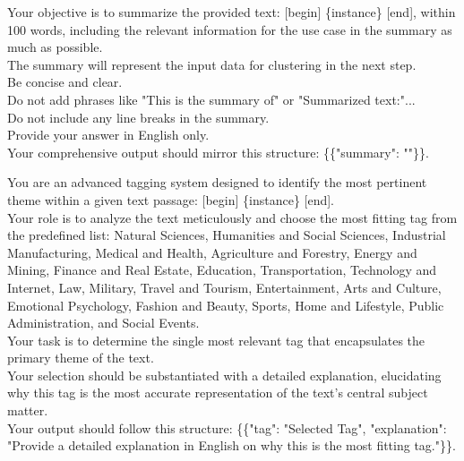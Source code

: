 \begin{tcolorbox}[title = {Prompt Template For Summary},breakable]
\label{summary}
\small
Your objective is to summarize the provided text: [begin] \{instance\} [end], within 100 words, including the relevant information for the use case in the summary as much as possible. \\
    The summary will represent the input data for clustering in the next step. \\
    Be concise and clear. \\
    Do not add phrases like "This is the summary of" or "Summarized text:"... \\
    Do not include any line breaks in the summary. \\
    Provide your answer in English only. \\
    Your comprehensive output should mirror this structure: \{\{"summary": ""\}\}. \\
\end{tcolorbox}

\begin{tcolorbox}[title = {Prompt Template For First-level Tagging},breakable]
\label{first-level tagging}
\small
You are an advanced tagging system designed to identify the most pertinent theme within a given text passage: [begin] \{instance\} [end].\\
    Your role is to analyze the text meticulously and choose the most fitting tag from the predefined list: Natural Sciences, Humanities and Social Sciences, Industrial Manufacturing, Medical and Health, Agriculture and Forestry, Energy and Mining, Finance and Real Estate, Education, Transportation, Technology and Internet, Law, Military, Travel and Tourism, Entertainment, Arts and Culture, Emotional Psychology, Fashion and Beauty, Sports, Home and Lifestyle, Public Administration, and Social Events.\\
    Your task is to determine the single most relevant tag that encapsulates the primary theme of the text. \\
    Your selection should be substantiated with a detailed explanation, elucidating why this tag is the most accurate representation of the text's central subject matter.\\
    Your output should follow this structure: \{\{"tag": "Selected Tag", "explanation": "Provide a detailed explanation in English  on why this is the most fitting tag."\}\}.
\end{tcolorbox}

